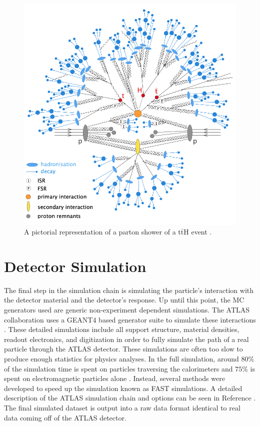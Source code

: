 		\begin{figure}[!ht]
		\centering
		\includegraphics[width=\textwidth,keepaspectratio=true]{chapters/chapter4_simulation/images/tth_hadronization_gen.png}
		\caption{\label{fig:hadronization} A pictorial representation of a parton shower of a t$\bar{\mathrm{t}}$H event \cite{Wanotayaroj:2242196}.}
		\end{figure}	

	\section{Detector Simulation}\label{sec:detector-sim}
		The final step in the simulation chain is simulating the particle's interaction with the detector material and the detector's response. Up until this point, the \gls{MC} generators used are generic non-experiment dependent simulations. The \gls{ATLAS} collaboration uses a GEANT4 based generator suite to simulate these interactions \cite{GEANT4}. These detailed simulations include all support structure, material densities, readout electronics, and digitization in order to fully simulate the path of a real particle through the \gls{ATLAS} detector. These simulations are often too slow to produce enough statistics for physics analyses. In the full simulation, around $80\%$ of the simulation time is spent on particles traversing the calorimeters and $75\%$ is spent on electromagnetic particles alone \cite{ATLAS-simulation}. Instead, several methods were developed to speed up the simulation known as FAST simulations. A detailed description of the \gls{ATLAS} simulation chain and options can be seen in Reference \cite{ATLAS-simulation}. The final simulated dataset is output into a raw data format identical to real data coming off of the \gls{ATLAS} detector. 

		
